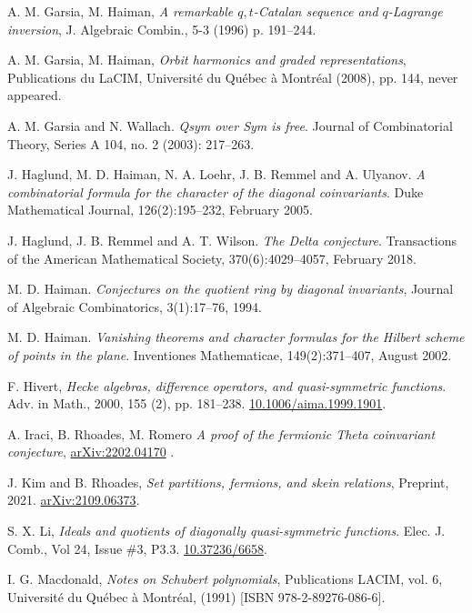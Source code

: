 \documentclass[11pt,oneside]{amsart}
\theoremstyle{definition}
\numberwithin{equation}{section}
\begin{document}
\begin{thebibliography}{999}
 A. M. Garsia, M. Haiman,
\textit {A remarkable {$q,t$}-{C}atalan sequence and {$q$}-{L}agrange inversion},
J. Algebraic Combin., 5-3 (1996) p. 191--244.

 A. M. Garsia, M. Haiman,
\textit{Orbit harmonics and graded representations},
Publications du LaCIM, Universit\'e du Qu\'ebec \`a Montr\'eal (2008), pp. 144,
never appeared.

 A. M. Garsia and N. Wallach.
\textit{Qsym over Sym is free}.
Journal of Combinatorial Theory, Series A 104, no. 2 (2003): 217--263.

 J. Haglund, M. D. Haiman, N. A. Loehr, J. B. Remmel and A. Ulyanov.
\textit{A combinatorial formula for the character of the diagonal coinvariants}.
Duke Mathematical Journal, 126(2):195--232, February 2005.

 J. Haglund, J. B. Remmel and A. T. Wilson.
\textit{The Delta conjecture}.
Transactions of the American Mathematical Society, 370(6):4029--4057, February 2018.

 M. D. Haiman.
\textit{Conjectures on the quotient ring by diagonal invariants},
Journal of Algebraic Combinatorics, 3(1):17--76, 1994.

 M. D. Haiman.
\textit{Vanishing theorems and character formulas for the Hilbert scheme of points in the plane}.
Inventiones Mathematicae, 149(2):371--407, August 2002.

 F. Hivert,
\textit{Hecke algebras, difference operators, and quasi-symmetric functions}.
Adv. in Math., 2000, 155 (2), pp. 181--238.
\href{https://doi-org/10.1006/aima.1999.1901}{10.1006/aima.1999.1901}.

 A. Iraci, B. Rhoades, M. Romero
\textit{A proof of the fermionic Theta coinvariant conjecture},
\href{https://arxiv.org/abs/2202.04170}{arXiv:2202.04170} .

 J. Kim and B. Rhoades,
\textit{Set partitions, fermions, and skein relations}, Preprint, 2021.
\href{https://arxiv.org/abs/2109.06373}{arXiv:2109.06373}.

 S. X. Li,
\textit{Ideals and quotients of diagonally quasi-symmetric functions}.
Elec. J. Comb., Vol 24, Issue \#3, P3.3.
\href{https://doi.org/10.37236/6658}{10.37236/6658}.

 I. G. Macdonald,
\textit{Notes on Schubert polynomials},
Publications LACIM, vol. 6, Universit\'e du Qu\'ebec \`a Montr\'eal,  (1991) [ISBN 978-2-89276-086-6].


\end{thebibliography}
\end{document}
